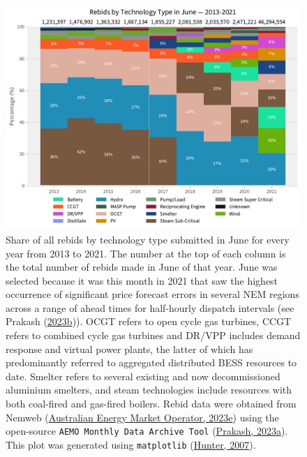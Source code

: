 \documentclass[12pt,a4paper,]{report}
\begin{document}
\begin{figure}
\hypertarget{fig:share_rebids_june_2013_2021}{%
\centering
\includegraphics{source/figures/rebids_june_share_by_tech_2013_2021.pdf}
\caption[Share of rebids by technology type in June from 2013 to
2021]{Share of all rebids by technology type submitted in June for every
year from 2013 to 2021. The number at the top of each column is the
total number of rebids made in June of that year. June was selected
because it was this month in 2021 that saw the highest occurrence of
significant price forecast errors in several NEM regions across a range
of ahead times for half-hourly dispatch intervals (see Prakash
(\protect\hyperlink{ref-prakashEnergyPriceConvergence2023}{2023b})).
OCGT refers to open cycle gas turbines, CCGT refers to combined cycle
gas turbines and DR/VPP includes demand response and virtual power
plants, the latter of which has predominantly referred to aggregated
distributed BESS resources to date. Smelter refers to several existing
and now decommissioned aluminium smelters, and steam technologies
include resources with both coal-fired and gas-fired boilers. Rebid data
were obtained from Nemweb
(\protect\hyperlink{ref-australianenergymarketoperatorNemwebMarketData2023}{Australian
Energy Market Operator, 2023e}) using the open-source
\texttt{AEMO\ Monthly\ Data\ Archive\ Tool}
(\protect\hyperlink{ref-prakashAEMOMonthlyData2023}{Prakash, 2023a}).
This plot was generated using \texttt{matplotlib}
(\protect\hyperlink{ref-hunterMatplotlib2DGraphics2007}{Hunter,
2007}).}\label{fig:share_rebids_june_2013_2021}
}
\end{figure}
\end{document}
